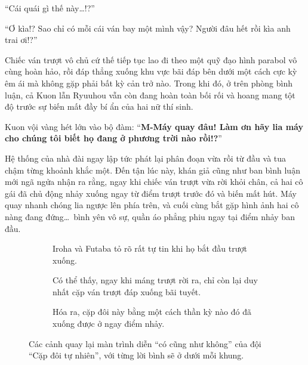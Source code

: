 \documentclass[../main.tex]{subfiles}
\begin{document}
``Cái quái gì thế này\dots!?''

``Ơ kìa!? Sao chỉ có mỗi cái ván bay một mình vậy? Người đâu hết rồi kìa anh trai ơi!?''

Chiếc ván trượt vô chủ cứ thế tiếp tục lao đi theo một quỹ đạo hình parabol vô cùng hoàn hảo, rồi đáp thẳng xuống khu vực bãi đáp bên dưới một cách cực kỳ êm ái mà không gặp phải bất kỳ cản trở nào. Trong khi đó, ở trên phòng bình luận, cả Kuon lẫn Ryuuhou vẫn còn đang hoàn toàn bối rối và hoang mang tột độ trước sự biến mất đầy bí ẩn của hai nữ thí sinh.

Kuon vội vàng hét lớn vào bộ đàm: ``\textbf{M-Máy quay đâu! Làm ơn hãy lia máy cho chúng tôi biết họ đang ở phương trời nào rồi!?}''

Hệ thống của nhà đài ngay lập tức phát lại phân đoạn vừa rồi từ đầu và tua chậm từng khoảnh khắc một. Đến tận lúc này, khán giả cũng như ban bình luận mới ngã ngửa nhận ra rằng, ngay khi chiếc ván trượt vừa rời khỏi chân, cả hai cô gái đã chủ động nhảy xuống ngay từ điểm trượt trước đó và biến mất hút. Máy quay nhanh chóng lia ngược lên phía trên, và cuối cùng bắt gặp hình ảnh hai cô nàng đang đứng\dots\ bình yên vô sự, quần áo phẳng phiu ngay tại điểm nhảy ban đầu.

\begin{figure}[H]
  \centering
  \begin{subfigure}[t]{0.45\textwidth}
    \centering
    \caption{Iroha và Futaba tỏ rõ rất tự tin khi họ bắt đầu trượt xuống.}
  \end{subfigure}
  \quad
  \begin{subfigure}[t]{0.45\textwidth}
    \centering
    \caption{Có thể thấy, ngay khi máng trượt rời ra, chỉ còn lại duy nhất cặp ván trượt đáp xuống bãi tuyết.}
  \end{subfigure}
  \quad
  \begin{subfigure}[t]{0.45\textwidth}
    \centering
    \caption{Hóa ra, cặp đôi này bằng một cách thần kỳ nào đó đã xuống được ở ngay điểm nhảy.}
  \end{subfigure}
  \caption{Các cảnh quay lại màn trình diễn ``có cũng như không'' của đội ``Cặp đôi tự nhiên'', với từng lời bình sẽ ở dưới mỗi khung.}
\end{figure}
\end{document}
